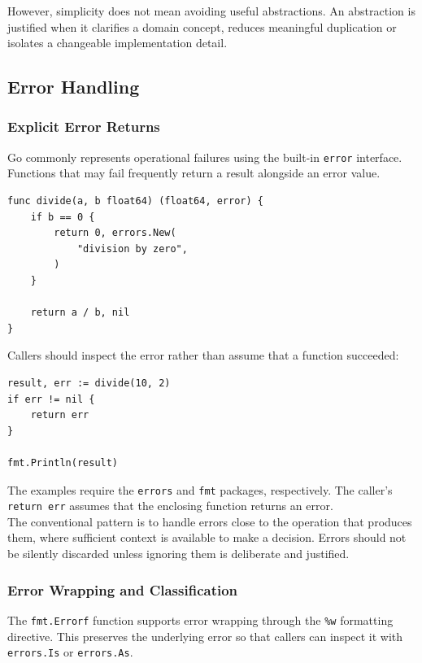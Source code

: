 However, simplicity does not mean avoiding useful abstractions. An abstraction is justified when it clarifies a domain concept, reduces meaningful duplication or isolates a changeable implementation detail.

\subsection{Error Handling}

\subsubsection{Explicit Error Returns}

Go commonly represents operational failures using the built-in \texttt{error} interface. Functions that may fail frequently return a result alongside an error value.

\begin{lstlisting}
func divide(a, b float64) (float64, error) {
    if b == 0 {
        return 0, errors.New(
            "division by zero",
        )
    }

    return a / b, nil
}
\end{lstlisting}

Callers should inspect the error rather than assume that a function succeeded:

\begin{lstlisting}
result, err := divide(10, 2)
if err != nil {
    return err
}

fmt.Println(result)
\end{lstlisting}

The examples require the \texttt{errors} and \texttt{fmt} packages, respectively. The caller's \texttt{return err} assumes that the enclosing function returns an error.\\

The conventional pattern is to handle errors close to the operation that produces them, where sufficient context is available to make a decision. Errors should not be silently discarded unless ignoring them is deliberate and justified.

\subsubsection{Error Wrapping and Classification}

The \texttt{fmt.Errorf} function supports error wrapping through the \texttt{\%w} formatting directive. This preserves the underlying error so that callers can inspect it with \texttt{errors.Is} or \texttt{errors.As}.

